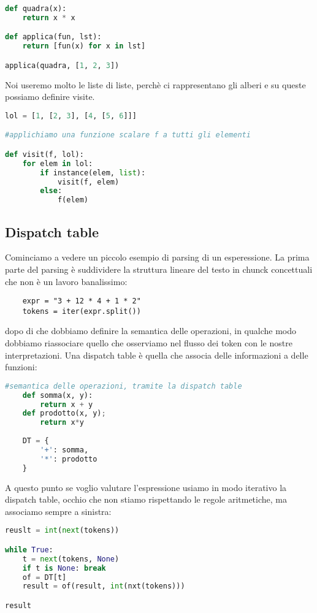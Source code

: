 \begin{lstlisting}[language=Python]
def quadra(x):
    return x * x

def applica(fun, lst):
    return [fun(x) for x in lst]

applica(quadra, [1, 2, 3])
\end{lstlisting}

Noi useremo molto le liste di liste, perchè ci rappresentano gli alberi e su queste possiamo definire visite.

\begin{lstlisting}[language=Python]
lol = [1, [2, 3], [4, [5, 6]]]

#applichiamo una funzione scalare f a tutti gli elementi

def visit(f, lol):
    for elem in lol:
        if instance(elem, list):
            visit(f, elem)
        else:
            f(elem)
\end{lstlisting}

\subsection{Dispatch table}
Cominciamo a vedere un piccolo esempio di parsing di un esperessione. La prima parte del parsing è suddividere la struttura lineare del testo in chunck concettuali che non è un lavoro banalissimo:

\begin{lstlisting}
    expr = "3 + 12 * 4 + 1 * 2"
    tokens = iter(expr.split())
\end{lstlisting}

dopo di che dobbiamo definire la semantica delle operazioni, in qualche modo dobbiamo riassociare quello che osserviamo nel flusso dei token con le nostre interpretazioni. Una dispatch table è quella che associa delle informazioni a delle funzioni:

\begin{lstlisting}[language=Python]
#semantica delle operazioni, tramite la dispatch table
    def somma(x, y):
        return x + y
    def prodotto(x, y);
        return x*y
    
    DT = {
        '+': somma,
        '*': prodotto
    }
\end{lstlisting}

A questo punto se voglio valutare l'espressione usiamo in modo iterativo la dispatch table, occhio che non stiamo rispettando le regole aritmetiche, ma associamo sempre a sinistra:

\begin{lstlisting}[language=Python]
reuslt = int(next(tokens))

while True:
    t = next(tokens, None)
    if t is None: break
    of = DT[t]
    result = of(result, int(nxt(tokens)))

result
\end{lstlisting}

